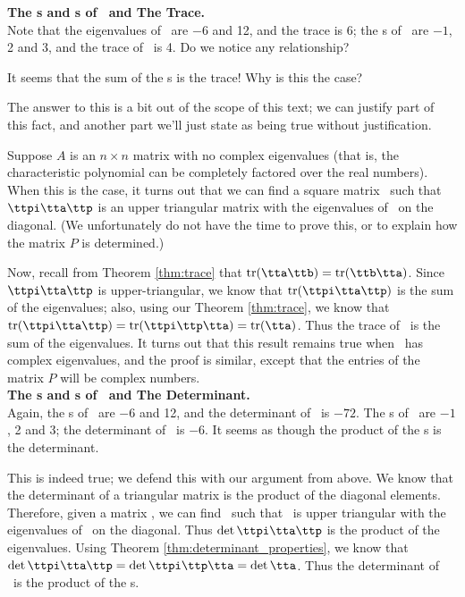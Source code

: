 
\noindent \textsf{\textbf{The \el s and \ev s of \tta\ and The Trace.}}\\

Note that the eigenvalues of \tta\ are $-6$ and 12, and the trace is 6; the \el s of \ttb\ are $-1$, 2 and 3, and the trace of \ttb\ is 4. Do we notice any relationship? 

It seems that the sum of the \el s is the trace! Why is this the case?

The answer to this is a bit out of the scope of this text; we can justify part of this fact, and another part we'll just state as being true without justification. 

Suppose $A$ is an $n\times n$ matrix with no complex eigenvalues (that is, the characteristic polynomial can be completely factored over the real numbers). When this is the case, it turns out that we can find a square matrix \ttp\ such that $\ttpi\tta\ttp$ is an upper triangular matrix with the eigenvalues of \tta\ on the diagonal. (We unfortunately do not have the time to prove this, or to explain how the matrix $P$ is determined.)


Now, recall from Theorem \ref{thm:trace} that $\tr(\tta\ttb) = \tr(\ttb\tta)$. Since $\ttpi\tta\ttp$ is upper-triangular, we know that $\tr(\ttpi\tta\ttp)$ is the sum of the eigenvalues; also, using our Theorem \ref{thm:trace}, we know that $\tr(\ttpi\tta\ttp) =  \tr(\ttpi\ttp\tta) =  \tr(\tta)$. Thus the trace of \tta\ is the sum of the eigenvalues. It turns out that this result remains true when \tta\ has complex eigenvalues, and the proof is similar, except that the entries of the matrix $P$ will be complex numbers.\\

\noindent \textsf{\textbf{The \el s and \ev s of \tta\ and The Determinant.}}\\

Again, the \el s of \tta\ are $-6$ and 12, and the determinant of \tta\ is 
$-72$. The \el s of \ttb\ are $-1$, 2 and 3; the determinant of \ttb\ is $-6$. It seems as though the product of the \el s is the determinant.

This is indeed true; we defend this with our argument from above. We know that the determinant of a triangular matrix is the product of the diagonal elements. Therefore, given a matrix \tta, we can find \ttp\ such that \ttpi\tta\ttp\ is upper triangular with the eigenvalues of \tta\ on the diagonal. Thus $\det{\ttpi\tta\ttp}$ is the product of the eigenvalues. Using Theorem \ref{thm:determinant_properties}, we know that $\det{\ttpi\tta\ttp} = \det{\ttpi\ttp\tta} = \det{\tta}$. Thus the determinant of \tta\ is the product of the \el s.

